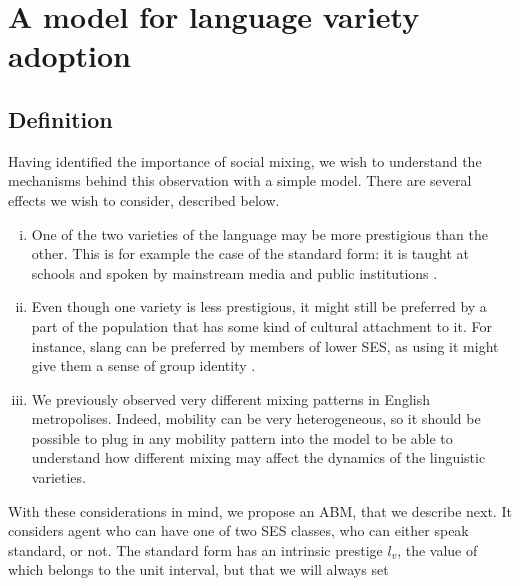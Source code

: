\documentclass[../thesis.tex]{subfiles}
\begin{document}
\section{A model for language variety adoption}

\subsection{Definition}
Having identified the importance of social mixing, we wish to understand the mechanisms
behind this observation with a simple model.
There are several effects we wish to
consider, described below.
\begin{enumerate}[(i)]
  \item One of the two varieties of the language may be more prestigious than the other.
  This is for example the case of the standard form: it is taught at schools and spoken
  by mainstream media and public institutions \cite{DavilaInevitabilityStandard2016}.
  \item Even though one variety is less prestigious, it might still be preferred by a
  part of the population that has some kind of cultural attachment to it. For instance,
  slang can be preferred by members of lower \ac{SES}, as using it might give them a
  sense of group identity
  \cite{LabovSocialStratification1966,TrudgillSocialDifferentiation1974}.
  \item We previously observed very different mixing patterns in English metropolises.
  Indeed, mobility can be very heterogeneous, so it should be possible to plug in any
  mobility pattern into the model to be able to understand how different mixing may
  affect the dynamics of the linguistic varieties.
\end{enumerate}
With these considerations in mind, we propose an \ac{ABM}, that we describe next. It
considers agent who can have one of two \ac{SES} classes,
who can either speak standard, or not. The standard form has an intrinsic prestige
$l_v$, the value of which belongs to the unit interval, but that we will always set
\end{document}
